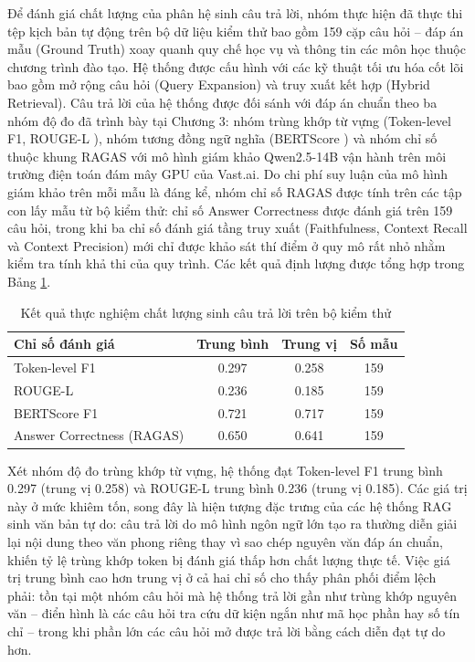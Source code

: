 Để đánh giá chất lượng của phân hệ sinh câu trả lời, nhóm thực hiện đã thực thi tệp kịch bản tự động trên bộ dữ liệu kiểm thử bao gồm 159 cặp câu hỏi -- đáp án mẫu (Ground Truth) xoay quanh quy chế học vụ và thông tin các môn học thuộc chương trình đào tạo. Hệ thống được cấu hình với các kỹ thuật tối ưu hóa cốt lõi bao gồm mở rộng câu hỏi (Query Expansion) và truy xuất kết hợp (Hybrid Retrieval). Câu trả lời của hệ thống được đối sánh với đáp án chuẩn theo ba nhóm độ đo đã trình bày tại Chương 3: nhóm trùng khớp từ vựng (Token-level F1, ROUGE-L \cite{lin2004rouge}), nhóm tương đồng ngữ nghĩa (BERTScore \cite{zhang2020bertscore}) và nhóm chỉ số thuộc khung RAGAS \cite{es2023ragas} với mô hình giám khảo Qwen2.5-14B vận hành trên môi trường điện toán đám mây GPU của Vast.ai. Do chi phí suy luận của mô hình giám khảo trên mỗi mẫu là đáng kể, nhóm chỉ số RAGAS được tính trên các tập con lấy mẫu từ bộ kiểm thử: chỉ số Answer Correctness được đánh giá trên 159 câu hỏi, trong khi ba chỉ số đánh giá tầng truy xuất (Faithfulness, Context Recall và Context Precision) mới chỉ được khảo sát thí điểm ở quy mô rất nhỏ nhằm kiểm tra tính khả thi của quy trình. Các kết quả định lượng được tổng hợp trong Bảng \ref{tab:ragas_results}.

\begin{table}[H]
    \centering
    \renewcommand{\arraystretch}{1.4}
    \caption{Kết quả thực nghiệm chất lượng sinh câu trả lời trên bộ kiểm thử}
    \label{tab:ragas_results}
    \begin{tabular}{|p{5.2cm}|c|c|c|}
        \hline
        \textbf{Chỉ số đánh giá} & \textbf{Trung bình} & \textbf{Trung vị} & \textbf{Số mẫu} \\ \hline
        Token-level F1 & 0.297 & 0.258 & 159 \\ \hline
        ROUGE-L & 0.236 & 0.185 & 159 \\ \hline
        BERTScore F1 & 0.721 & 0.717 & 159 \\ \hline
        Answer Correctness (RAGAS) & 0.650 & 0.641 & 159 \\ \hline
    \end{tabular}
\end{table}

Xét nhóm độ đo trùng khớp từ vựng, hệ thống đạt Token-level F1 trung bình 0.297 (trung vị 0.258) và ROUGE-L trung bình 0.236 (trung vị 0.185). Các giá trị này ở mức khiêm tốn, song đây là hiện tượng đặc trưng của các hệ thống RAG sinh văn bản tự do: câu trả lời do mô hình ngôn ngữ lớn tạo ra thường diễn giải lại nội dung theo văn phong riêng thay vì sao chép nguyên văn đáp án chuẩn, khiến tỷ lệ trùng khớp token bị đánh giá thấp hơn chất lượng thực tế. Việc giá trị trung bình cao hơn trung vị ở cả hai chỉ số cho thấy phân phối điểm lệch phải: tồn tại một nhóm câu hỏi mà hệ thống trả lời gần như trùng khớp nguyên văn -- điển hình là các câu hỏi tra cứu dữ kiện ngắn như mã học phần hay số tín chỉ -- trong khi phần lớn các câu hỏi mở được trả lời bằng cách diễn đạt tự do hơn.

